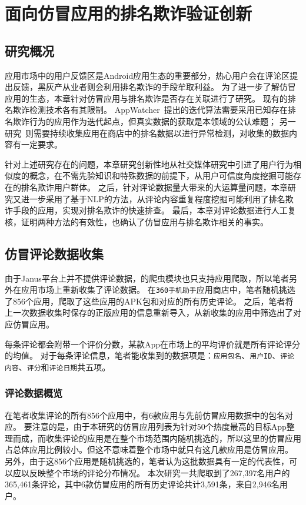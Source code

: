 \chapter{面向仿冒应用的排名欺诈验证创新}
\label{chp:feedback}

\section{研究概况}
应用市场中的用户反馈区是Android应用生态的重要部分，热心用户会在评论区提出反馈，黑灰产从业者则会利用排名欺诈的手段牟取利益。
为了进一步了解仿冒应用的生态，本章针对仿冒应用与排名欺诈是否存在关联进行了研究。
现有的排名欺诈检测技术各有其限制。
AppWatcher~\cite{xie2015appwatcher}提出的迭代算法需要采用已知存在排名欺诈行为的应用作为迭代起点，但真实数据的获取是本领域的公认难题；
另一研究~\cite{zhu2014discovery}则需要持续收集应用在商店中的排名数据以进行异常检测，对收集的数据内容有一定要求。

针对上述研究存在的问题，本章研究创新性地从社交媒体研究中引进了用户行为相似度的概念，在不需先验知识和特殊数据的前提下，从用户可信度角度挖掘可能存在的排名欺诈用户群体。
之后，针对评论数据量大带来的大运算量问题，本章研究又进一步采用了基于NLP的方法，从评论内容重复程度挖掘可能利用了排名欺诈手段的应用，实现对排名欺诈的快速排查。
最后，本章对评论数据进行人工复核，证明两种方法的有效性，也确认了仿冒应用与排名欺诈相关的事实。


\section{仿冒评论数据收集}
由于Janus平台上并不提供评论数据，\mytool 的爬虫模块也只支持应用爬取，所以笔者另外在应用市场上重新收集了评论数据。
在\texttt{360手机助手}应用商店中，笔者随机挑选了856个应用，爬取了这些应用的APK包和对应的所有历史评论。
之后，笔者将上一次数据收集时保存的正版应用的信息重新导入\mytool，从新收集的应用中筛选出了对应仿冒应用。

每条评论都会附带一个评价分数，某款App在市场上的平均评价就是所有评论评分的均值。
对于每条评论信息，笔者能收集到的数据项是：\texttt{应用包名}、\texttt{用户ID}、\texttt{评论内容}、\texttt{评分}和\texttt{评论日期}共五项。

\subsection{评论数据概览}
在笔者收集评论的所有856个应用中，有6款应用与先前仿冒应用数据中的包名对应。
要注意的是，由于本研究的仿冒应用列表为针对50个热度最高的目标App整理而成，而收集评论的应用是在整个市场范围内随机挑选的，所以这里的仿冒应用占总体应用比例较小。但这不意味着整个市场中就只有这几款应用是仿冒应用。
另外，由于这856个应用是随机挑选的，笔者认为这批数据具有一定的代表性，可以应以反映整个市场的评论分布情况。
本次研究一共爬取到了267,397名用户的365,461条评论，其中6款仿冒应用的所有历史评论共计3,591条，来自2,946名用户。


